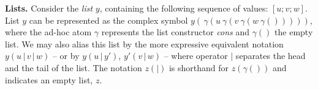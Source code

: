 


\medskip
\noindent
\textbf{Lists.} Consider the \emph{list} $y$, containing the following sequence of values: 
$[u; v; w]$. 
List $y$ can be represented as the complex symbol
$y(\, \gamma(u~\gamma(v~\gamma(w~\gamma()))))$, 
where the ad-hoc atom $\gamma$ represents the list constructor \emph{cons} and $\gamma()$ the empty list.
We may also alias this list by the more expressive equivalent notation
$y(u\,|\,v\,|\,w)$
-- or by $y(u\,|\,y')$, $y'(v\,|\,w)$ --
where operator $\mid$ separates the head and the tail of the list.
The notation $z(|)$ is shorthand for $z(\gamma())$ and indicates an empty list, $z$.



